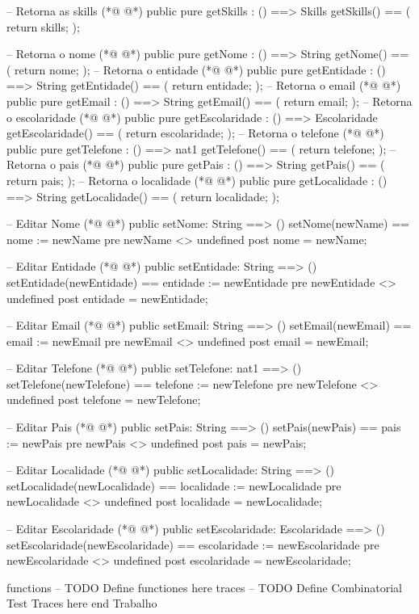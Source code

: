 \begin{vdmpp}[breaklines=true]
 -- Retorna as skills
(*@
\label{getSkills:80}
@*)
 public pure getSkills : () ==> Skills
 getSkills() ==
 (
  return skills;
 );
 
 -- Retorna o nome
(*@
\label{getNome:87}
@*)
 public pure getNome : () ==> String
 getNome() ==
 (
  return nome;
 );
 -- Retorna o entidade
(*@
\label{getEntidade:93}
@*)
 public pure getEntidade : () ==> String
 getEntidade() ==
 (
  return entidade;
 );
 -- Retorna o email
(*@
\label{getEmail:99}
@*)
 public pure getEmail : () ==> String
 getEmail() ==
 (
  return email;
 );
 -- Retorna o escolaridade
(*@
\label{getEscolaridade:105}
@*)
 public pure getEscolaridade : () ==> Escolaridade
 getEscolaridade() ==
 (
  return escolaridade;
 );
 -- Retorna o telefone
(*@
\label{getTelefone:111}
@*)
 public pure getTelefone : () ==> nat1
 getTelefone() ==
 (
  return telefone;
 );
 -- Retorna o pais
(*@
\label{getPais:117}
@*)
 public pure getPais : () ==> String
 getPais() ==
 (
  return pais;
 );
 -- Retorna o localidade
(*@
\label{getLocalidade:123}
@*)
 public pure getLocalidade : () ==> String
 getLocalidade() ==
 (
  return localidade;
 );
 
 
 -- Editar Nome
(*@
\label{setNome:131}
@*)
 public setNome: String ==> ()
 setNome(newName) == nome := newName
 pre newName <> undefined
 post nome = newName;
 
 -- Editar Entidade
(*@
\label{setEntidade:137}
@*)
 public setEntidade: String ==> ()
 setEntidade(newEntidade) == entidade := newEntidade
 pre newEntidade <> undefined
 post entidade = newEntidade;
 
 -- Editar Email
(*@
\label{setEmail:143}
@*)
 public setEmail: String ==> ()
 setEmail(newEmail) == email := newEmail
 pre newEmail <> undefined
 post email = newEmail;
 
 -- Editar Telefone
(*@
\label{setTelefone:149}
@*)
 public setTelefone: nat1 ==> ()
 setTelefone(newTelefone) == telefone := newTelefone
 pre newTelefone <> undefined
 post telefone = newTelefone;

 -- Editar Pais
(*@
\label{setPais:155}
@*)
 public setPais: String ==> ()
 setPais(newPais) == pais := newPais
 pre newPais <> undefined
 post pais = newPais;
 
 -- Editar Localidade
(*@
\label{setLocalidade:161}
@*)
 public setLocalidade: String ==> ()
 setLocalidade(newLocalidade) == localidade := newLocalidade
 pre newLocalidade <> undefined
 post localidade = newLocalidade;
 
 -- Editar Escolaridade
(*@
\label{setEscolaridade:167}
@*)
 public setEscolaridade: Escolaridade ==> ()
 setEscolaridade(newEscolaridade) == escolaridade := newEscolaridade
 pre newEscolaridade <> undefined
 post escolaridade = newEscolaridade;
  
functions
-- TODO Define functiones here
traces
-- TODO Define Combinatorial Test Traces here
end Trabalho
\end{vdmpp}
